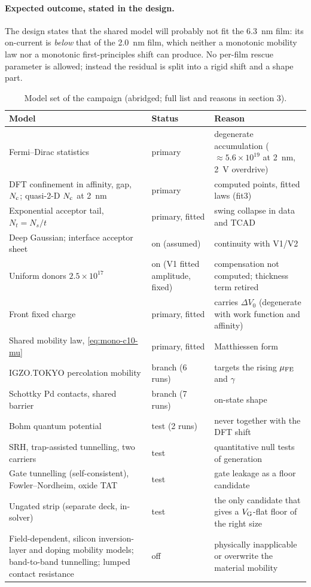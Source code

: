 \paragraph{Expected outcome, stated in the design.} The design states that the shared model will probably not fit the
6.3~nm film: its on-current is \emph{below} that of the 2.0~nm film, which neither a monotonic mobility law nor a
monotonic first-principles shift can produce. No per-film rescue parameter is allowed; instead the residual is split
into a rigid shift and a shape part.

\begin{table}[htbp]\centering\small
\caption{Model set of the campaign (abridged; full list and reasons in  section 3).}
\label{tab:mono-c10-models}
\begin{tabularx}{\linewidth}{@{}>{\raggedright\arraybackslash}p{5.3cm}>{\raggedright\arraybackslash}p{2.1cm}>{\raggedright\arraybackslash}X@{}}
\toprule
Model & Status & Reason \\\midrule
Fermi--Dirac statistics & primary & degenerate accumulation ($\approx5.6\times10^{19}$\cmcu{} at 2~nm, 2~V overdrive) \\
DFT confinement in affinity, gap, $N_{\mathrm{c}}$; quasi-2-D $N_{\mathrm{c}}$ at 2~nm & primary & computed points, fitted laws (fit3) \\
Exponential acceptor tail, $N_t = N_s/t$ & primary, fitted & swing collapse in data and TCAD \\
Deep Gaussian; interface acceptor sheet & on (assumed) & continuity with V1/V2 \\
Uniform donors $2.5\times10^{17}$\cmcu{} & on (V1 fitted amplitude, fixed) & compensation not computed; thickness term retired \\
Front fixed charge & primary, fitted & carries $\Delta V_0$ (degenerate with work function and affinity) \\
Shared mobility law, \cref{eq:mono-c10-mu} & primary, fitted & Matthiessen form \\
IGZO.TOKYO percolation mobility & branch (6 runs) & targets the rising $\mu_{\mathrm{FE}}$ and $\gamma$ \\
Schottky Pd contacts, shared barrier & branch (7 runs) & on-state shape \\
Bohm quantum potential & test (2 runs) & never together with the DFT shift \\
SRH, trap-assisted tunnelling, two carriers & test & quantitative null tests of generation \\
Gate tunnelling (self-consistent), Fowler--Nordheim, oxide TAT & test & gate leakage as a floor candidate \\
Ungated strip (separate deck, in-solver) & test & the only candidate that gives a $V_{\mathrm{G}}$-flat floor of the right size \\
Field-dependent, silicon inversion-layer and doping mobility models; band-to-band tunnelling; lumped contact resistance & off & physically inapplicable or
overwrite the material mobility \\\bottomrule
\end{tabularx}
\end{table}

